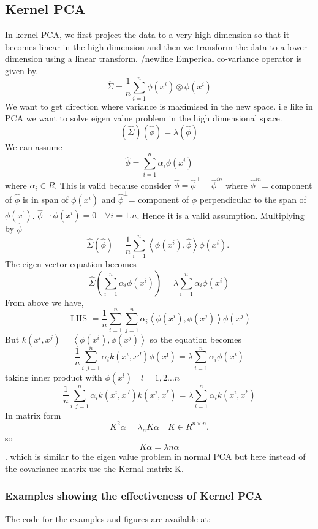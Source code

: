 \documentclass[../main.tex]{subfiles}
\begin{document}
    \subsection{Kernel PCA}
In kernel PCA, we first project the data to a very high dimension so that it becomes linear in the high dimension and then we transform the data to a lower dimension using a linear transform. 
/newline
Emperical co-variance operator is given by.
$$
\hat{\Sigma}=\frac{1}{n} \sum_{i=1}^{n} \phi\left(x^{i}\right) \otimes \phi\left(x^{i}\right)
$$
We want to get direction where variance is maximised in the new space. i.e like in PCA we want to solve eigen value problem in the high dimensional space.
$$
(\hat{\Sigma})(\hat{\phi})=\lambda(\hat{\phi})
$$
We can assume $$\hat{\phi}=\sum_{i=1}^{n} \alpha_{i} \phi\left(x^{i}\right)$$ where $\alpha_{i} \in R$. 
This is valid because consider $\hat{\phi}=\hat{\phi}^{\perp}+\hat{\phi}^{in}$ where
$\hat{\phi}^{in}$= component of $\hat{\phi}$ is in span of $\phi\left(x^{i}\right)$ and
$\hat{\phi}^{\perp}$= component of $\hat{\phi}$ perpendicular to the span of $\phi\left(x^{\prime}\right)$. $\hat{\phi}^{\perp} \cdot \phi\left(x^{i}\right)=0 \quad \forall i=1 . n$. Hence it is a valid assumption.
Multiplying by $\hat{\phi}$
$$
\hat{\Sigma}(\hat{\phi})=\frac{1}{n} \sum_{i=1}^{n}\left\langle\phi\left(x^{i}\right), \hat{\phi}\right\rangle \phi\left(x^{i}\right) \text {. }
$$
The eigen vector equation becomes
$$
\hat{\Sigma}\left(\sum_{i=1}^{n} \alpha_{i} \phi\left(x^{i}\right)\right)=\lambda \sum_{i=1}^{n} \alpha_{i} \phi\left(x^{i}\right)
$$
From above we have,
$$
\text { LHS }=\frac{1}{n} \sum_{i=1}^{n} \sum_{j=1}^{n} \alpha_{i}\left\langle\phi\left(x^{i}\right), \phi\left(x^{j}\right)\right\rangle \phi\left(x^{j}\right)
$$
But $k\left(x^{i}, x^{j}\right)=\left\langle\phi\left(x^{i}\right), \phi\left(x^{j}\right)\right\rangle$
so the equation becomes
$$
\frac{1}{n} \sum_{i, j=1}^{n} \alpha_{i} k\left(x^{i}, x^{J}\right) \phi\left(x^{\mathrm{j}}\right)=\lambda \sum_{i=1}^{n} \alpha_{i} \phi\left(x^{i}\right)
$$
taking inner product with $\phi\left(x^{l}\right) \quad l=1,2 \ldots n$
$$
\frac{1}{n} \sum_{i, j=1}^{n} \alpha_{i} k\left(x^{i}, x^{J}\right) k\left(x^{j}, x^{\ell}\right)=\lambda \sum_{i=1}^{n} \alpha_{i} k\left(x^{i}, x^{\ell}\right)
$$
In matrix form
$$
K^{2} \alpha=\lambda_{n} K \alpha \quad K \in R^{n \times n} .
$$
so $$K \alpha=\lambda n \alpha$$.
which is similar to the eigen value problem in normal PCA but here instead of the covariance matrix use the Kernal matrix K.

\subsubsection{Examples showing the effectiveness of Kernel PCA}
The code for the examples and figures are available at:
\end{document}
